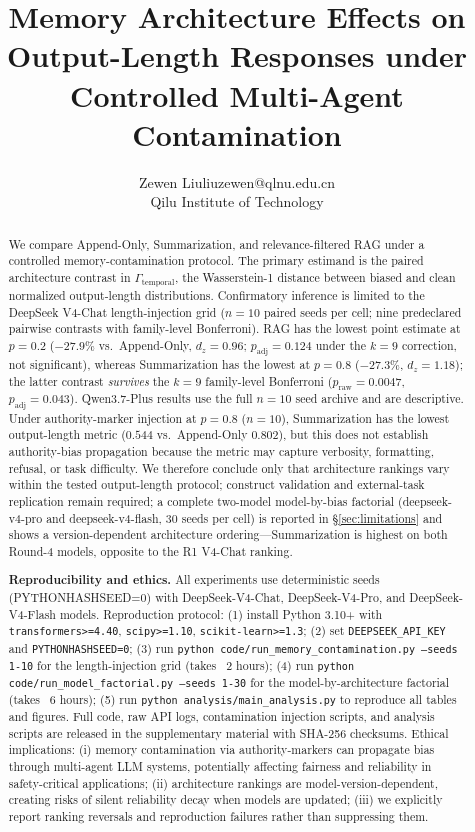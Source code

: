 \documentclass[11pt]{article}
\title{Memory Architecture Effects on Output-Length Responses under Controlled Multi-Agent Contamination}
\author{\name Zewen Liu\email liuzewen@qlnu.edu.cn\\\addr Qilu Institute of Technology}  %
\date{}
\begin{document}
\maketitle

\begin{abstract}
We compare Append-Only, Summarization, and relevance-filtered RAG under a controlled memory-contamination protocol. The primary estimand is the paired architecture contrast in $\Gamma_{\text{temporal}}$, the Wasserstein-1 distance between biased and clean normalized output-length distributions. Confirmatory inference is limited to the DeepSeek V4-Chat length-injection grid ($n{=}10$ paired seeds per cell; nine predeclared pairwise contrasts with family-level Bonferroni). RAG has the lowest point estimate at $p{=}0.2$ ($-27.9\%$ vs.\ Append-Only, $d_z{=}0.96$; $p_{\text{adj}}{=}0.124$ under the $k{=}9$ correction, not significant), whereas Summarization has the lowest at $p{=}0.8$ ($-27.3\%$, $d_z{=}1.18$); the latter contrast \emph{survives} the $k{=}9$ family-level Bonferroni ($p_{\text{raw}}{=}0.0047$, $p_{\text{adj}}{=}0.043$). Qwen3.7-Plus results use the full $n{=}10$ seed archive and are descriptive. Under authority-marker injection at $p{=}0.8$ ($n{=}10$), Summarization has the lowest output-length metric ($0.544$ vs.\ Append-Only $0.802$), but this does not establish authority-bias propagation because the metric may capture verbosity, formatting, refusal, or task difficulty. We therefore conclude only that architecture rankings vary within the tested output-length protocol; construct validation and external-task replication remain required; a complete two-model model-by-bias factorial (deepseek-v4-pro and deepseek-v4-flash, 30 seeds per cell) is reported in \S\ref{sec:limitations} and shows a version-dependent architecture ordering---Summarization is highest on both Round-4 models, opposite to the R1 V4-Chat ranking.


\textbf{Reproducibility and ethics.} All experiments use deterministic seeds (PYTHONHASHSEED=0) with DeepSeek-V4-Chat, DeepSeek-V4-Pro, and DeepSeek-V4-Flash models. Reproduction protocol: (1) install Python 3.10+ with \texttt{transformers>=4.40}, \texttt{scipy>=1.10}, \texttt{scikit-learn>=1.3}; (2) set \texttt{DEEPSEEK\_API\_KEY} and \texttt{PYTHONHASHSEED=0}; (3) run \texttt{python code/run\_memory\_contamination.py --seeds 1-10} for the length-injection grid (takes ~2 hours); (4) run \texttt{python code/run\_model\_factorial.py --seeds 1-30} for the model-by-architecture factorial (takes ~6 hours); (5) run \texttt{python analysis/main\_analysis.py} to reproduce all tables and figures. Full code, raw API logs, contamination injection scripts, and analysis scripts are released in the supplementary material with SHA-256 checksums. Ethical implications: (i) memory contamination via authority-markers can propagate bias through multi-agent LLM systems, potentially affecting fairness and reliability in safety-critical applications; (ii) architecture rankings are model-version-dependent, creating risks of silent reliability decay when models are updated; (iii) we explicitly report ranking reversals and reproduction failures rather than suppressing them.\end{abstract}
\end{document}
